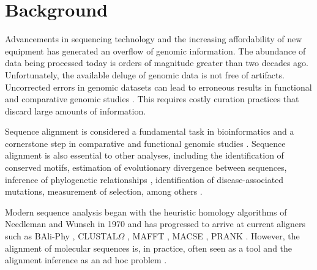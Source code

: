 \section{Background}


Advancements in sequencing technology and the increasing affordability of new
equipment has generated an overflow of genomic information.
The abundance of data being processed today is orders of magnitude greater than
two decades ago. %
Unfortunately, the available deluge of genomic data is not free of artifacts.
Uncorrected errors in genomic datasets can lead to erroneous results in
functional and comparative genomic studies \parencite{estimates_schneider_2009}.
This requires costly curation practices that discard large amounts of
information.

Sequence alignment is considered a fundamental task in bioinformatics and a
cornerstone step in comparative and functional genomic studies
\parencite{sequence_alignment_rosenberg_2009}.
Sequence alignment is also essential to other analyses, including the
identification of conserved motifs, estimation of evolutionary divergence
between sequences, inference of phylogenetic relationships
\parencite{MSA_kumar_2007}, identification of disease-associated mutations,
measurement of selection, among others
\parencite{sequence_alignment_rosenberg_2009}.

Modern sequence analysis began with the heuristic homology algorithms of
Needleman and Wunsch in 1970 \parencite{identification_smith_1981} and has
progressed to arrive at current aligners such as BAli-Phy \parencite{suchard_baliphy_2006},
CLUSTAL$\Omega$ \parencite{clustal_omega_sievers_2011}, MAFFT \parencite{mafft_katoh_2002},
MACSE \parencite{ranwez_macse_2011}, PRANK \parencite{prank_loytynoja_2014}.
However, the alignment of molecular sequences is, in practice, often seen as a
tool and the alignment inference as an ad hoc problem
\parencite{morrison_MSA_2018}.

